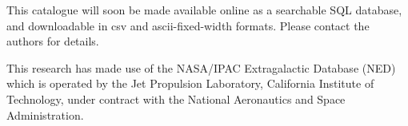 \documentclass[twocolumn,tighten]{aastex62}
\begin{document}
This catalogue will soon be made available online as a searchable SQL database, and downloadable in csv and ascii-fixed-width formats. Please contact the authors for details.

\acknowledgements

This research has made use of the NASA/IPAC Extragalactic Database (NED) which is operated by the Jet Propulsion Laboratory, California Institute of Technology, under contract with the National Aeronautics and Space Administration. 



{}

\end{document}

